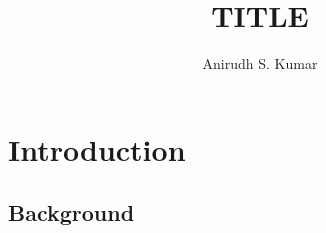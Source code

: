 \documentclass[letterpage, 11pt]{report}
\title{TITLE}
\author{Anirudh S. Kumar}
\begin{document}


\tableofcontents

\chapter{Introduction}\label{chapter:introduction}
\setcounter{page}{1}
\onehalfspacing

\section{Background}


\lipsum[1]
\lipsum[2]
\lipsum[3]

\lipsum[1]
\lipsum[2]
\lipsum[3]

\printbibliography
\end{document}
